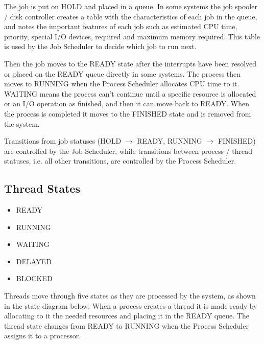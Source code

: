 \documentclass[12pt letter]{report}
\begin{document}
The job is put on HOLD and placed in a queue. In some systems the job
spooler / disk controller creates a table with the characteristics of
each job in the queue, and notes the important features of each job
such as estimated CPU time, priority, special I/O devices, required
and maximum memory required. This table is used by the Job Scheduler
to decide which job to run next.

Then the job moves to the READY state after the interrupts have been
resolved or placed on the READY queue directly in some systems. The
process then moves to RUNNING when the Process Scheduler allocates
CPU time to it. WAITING means the process can't continue until a
specific resource is allocated or an I/O operation as finished, and
then it can move back to READY. When the process is completed it
moves to the FINISHED state and is removed from the system.

Transitions from job statuses (HOLD $\to $ READY, RUNNING $\to $
FINISHED) are controlled by the Job Scheduler, while transitions
between process / thread statuses, i.e. all other transitions, are
controlled by the Process Scheduler.

\subsection{Thread States}
\begin{itemize}
  \item READY
  \item RUNNING
  \item WAITING
  \item DELAYED
  \item BLOCKED
\end{itemize}

Threads move through five states as they are processed by the system,
as shown in the state diagram below. When a process creates a thread
it is made ready by allocating to it the needed resources and placing
it in the READY queue. The thread state changes from READY to RUNNING
when the Process Scheduler assigns it to a processor.
\end{document}
